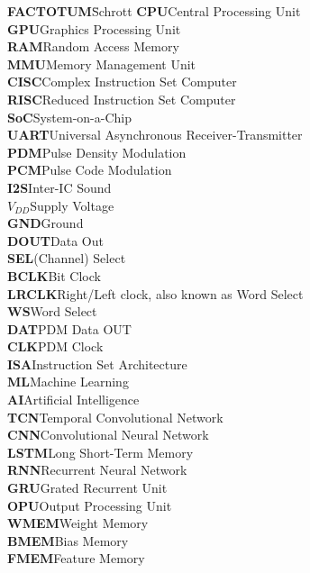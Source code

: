 \documentclass[oneside,11pt,a4paper,twoside]{scrreprt}
\begin{document}
\begin{tabbing}
\textbf{FACTOTUM}\hspace{1cm}\=Schrott\kill
\textbf{CPU}\>Central Processing Unit
\\
\textbf{GPU}\>Graphics Processing Unit
\\
\textbf{RAM}\>Random Access Memory
\\
\textbf{MMU}\>Memory Management Unit
\\
\textbf{CISC}\>Complex Instruction Set Computer
\\
\textbf{RISC}\>Reduced Instruction Set Computer
\\
\textbf{SoC}\>System-on-a-Chip
\\
\textbf{UART}\>Universal Asynchronous Receiver-Transmitter
\\
\textbf{PDM}\>Pulse Density Modulation
\\
\textbf{PCM}\>Pulse Code Modulation
\\
\textbf{I2S}\>Inter-IC Sound
\\
\textbf{$V_{DD}$}\>Supply Voltage
\\
\textbf{GND}\>Ground
\\
\textbf{DOUT}\>Data Out
\\
\textbf{SEL}\>(Channel) Select
\\
\textbf{BCLK}\>Bit Clock
\\
\textbf{LRCLK}\>Right/Left clock, also known as Word Select
\\
\textbf{WS}\>Word Select
\\
\textbf{DAT}\>PDM Data OUT
\\
\textbf{CLK}\>PDM Clock
\\
\textbf{ISA}\>Instruction Set Architecture
\\
\textbf{ML}\>Machine Learning
\\
\textbf{AI}\>Artificial Intelligence
\\
\textbf{TCN}\>Temporal Convolutional Network
\\
\textbf{CNN}\>Convolutional Neural Network
\\
\textbf{LSTM}\>Long Short-Term Memory
\\
\textbf{RNN}\>Recurrent Neural Network
\\
\textbf{GRU}\>Grated Recurrent Unit
\\
\textbf{OPU}\>Output Processing Unit
\\
\textbf{WMEM}\>Weight Memory
\\
\textbf{BMEM}\>Bias Memory
\\
\textbf{FMEM}\>Feature Memory

\end{tabbing}
\end{document}
